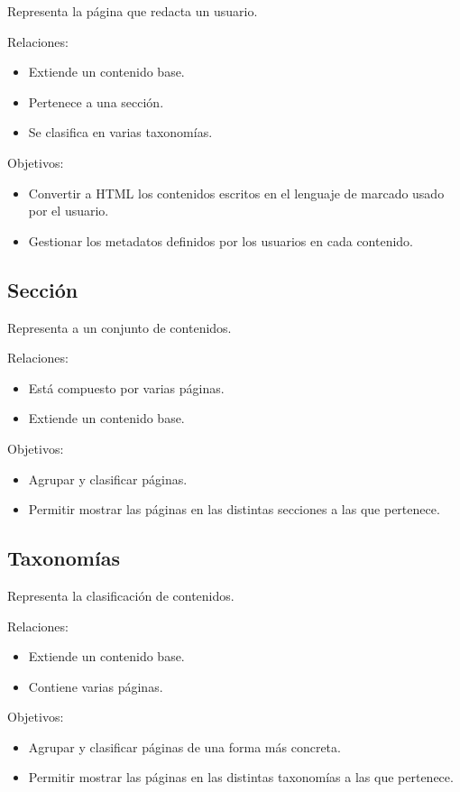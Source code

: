 Representa la página que redacta un usuario.

Relaciones:
\begin{itemize}
    \item Extiende un contenido base.
    \item Pertenece a una sección.
    \item Se clasifica en varias taxonomías.
\end{itemize}

Objetivos:
\begin{itemize}
    \item Convertir a HTML los contenidos escritos en el lenguaje de marcado usado por el usuario.
    \item Gestionar los metadatos definidos por los usuarios en cada contenido.
\end{itemize}

\subsection{Sección}

Representa a un conjunto de contenidos.

Relaciones:
\begin{itemize}
    \item Está compuesto por varias páginas.
    \item Extiende un contenido base.
\end{itemize}

Objetivos:
\begin{itemize}
    \item Agrupar y clasificar páginas.
    \item Permitir mostrar las páginas en las distintas secciones a las que pertenece.
\end{itemize}

\subsection{Taxonomías}

Representa la clasificación de contenidos.

Relaciones:
\begin{itemize}
    \item Extiende un contenido base.
    \item Contiene varias páginas.
\end{itemize}

Objetivos:
\begin{itemize}
    \item Agrupar y clasificar páginas de una forma más concreta.
    \item Permitir mostrar las páginas en las distintas taxonomías a las que pertenece.
\end{itemize}

